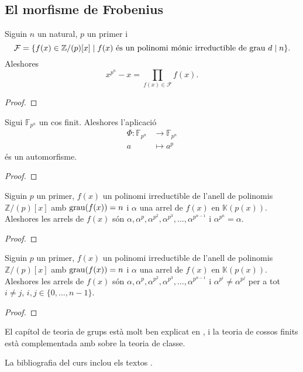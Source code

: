 \documentclass[../../Main.tex]{subfiles}
\begin{document}
	\subsection{El morfisme de Frobenius}	%
	\begin{theorem}
		Siguin \(n\) un natural, \(p\) un primer i
		\[\mathcal{F}=\{f(x)\in\mathbb{Z}/(p)[x]\mid f(x)\text{ és un polinomi mónic irreductible de grau }d\mathrel{|} n\}.\]
		Aleshores
		\[x^{p^{n}}-x=\prod_{f(x)\in\mathcal{F}}f(x).\]
		\begin{proof}
		\end{proof}
	\end{theorem}
	\begin{proposition}
		Sigui \(\mathbb{F}_{p^{n}}\) un cos finit. Aleshores l'aplicació
		\begin{align*}
		\Phi\colon\mathbb{F}_{p^{n}}&\longrightarrow\mathbb{F}_{p^{n}}\\
		a&\longmapsto a^{p}
		\end{align*}
		és un automorfisme.
		\begin{proof}
		\end{proof}
	\end{proposition}
	\begin{theorem}
		Siguin \(p\) un primer, \(f(x)\) un polinomi irreductible de l'anell de polinomis \(\mathbb{Z}/(p)[x]\) amb \(\operatorname{grau}(f(x))=n\) i \(\alpha\) una arrel de \(f(x)\) en \(\mathbb{K}(p(x))\). Aleshores les arrels de \(f(x)\) són \(\alpha,\alpha^{p},\alpha^{p^{2}},\alpha^{p^{3}},\dots,\alpha^{p^{n-1}}\) i \(\alpha^{p^{n}}=\alpha\).
		\begin{proof}
		\end{proof}
	\end{theorem}
	\begin{theorem}
		Siguin \(p\) un primer, \(f(x)\) un polinomi irreductible de l'anell de polinomis \(\mathbb{Z}/(p)[x]\) amb \(\operatorname{grau}(f(x))=n\) i \(\alpha\) una arrel de \(f(x)\) en \(\mathbb{K}(p(x))\). Aleshores les arrels de \(f(x)\) són \(\alpha,\alpha^{p},\alpha^{p^{2}},\alpha^{p^{3}},\dots,\alpha^{p^{n-1}}\) i \(\alpha^{p^{i}}\neq\alpha^{p^{j}}\) per a tot \(i\neq j\), \(i,j\in\{0,\dots,n-1\}\).
		\begin{proof}
		\end{proof}
	\end{theorem}
	\printbibliography
	El capítol de teoria de grups està molt ben explicat en \cite{NumerosGruposyAnillos}, i la teoria de cossos finits està complementada amb \cite{AntoineRosaCampsMoncasiIntroduccioAlgebraAbstracta} sobre la teoria de classe.
	
	La bibliografia del curs inclou els textos \cite{NumerosGruposyAnillos, AntoineRosaCampsMoncasiIntroduccioAlgebraAbstracta, CedoAlgebraBasica, CohnBasicAlgebra, FelixConcepcionSebastianIntroduccionAlAlgebra, FraleighFirstCourseAbstractAlgebra, HungerfordAlgebra}.
\end{document}
